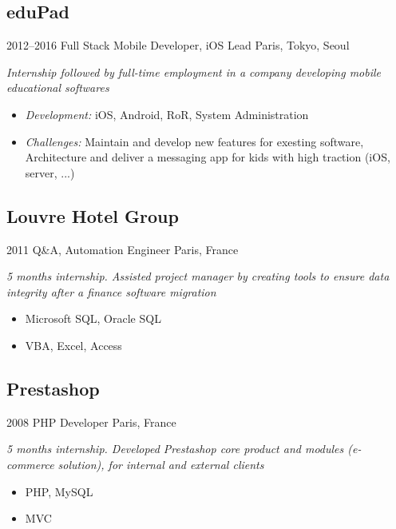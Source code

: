 \documentclass[]{template/friggeri-cv} %
\begin{document}
\subsection{eduPad}
\begin{entrylist}


\entry
{2012--2016}
{Full Stack Mobile Developer, iOS Lead}
{Paris, Tokyo, Seoul}
{\emph{Internship followed by full-time employment in a company developing mobile educational softwares}
\begin{itemize}
\item{\emph{Development:} iOS, Android, RoR, System Administration}
\item{\emph{Challenges:} Maintain and develop new features for exesting software, Architecture and deliver a messaging app for kids with high traction (iOS, server, ...)}

\end{itemize}
}

\end{entrylist}



\subsection{Louvre Hotel Group}
\begin{entrylist}
\entry
{2011}
{Q\&A, Automation Engineer}
{Paris, France}
{\emph{5 months internship. Assisted project manager by creating tools to ensure data integrity after a finance software migration}\\
\begin{itemize}
\item {Microsoft SQL, Oracle SQL}
\item {VBA, Excel, Access}

\end{itemize}

}
\end{entrylist}

\goodbreak
\subsection{Prestashop}
\begin{entrylist}
\entry
{2008}
{PHP Developer}
{Paris, France}
{\emph{5 months internship. Developed Prestashop core product and modules (e-commerce solution), for internal and external clients}

\begin{itemize}

\item {PHP, MySQL}
\item {MVC}

\end{itemize}
}
\end{entrylist}
\end{document}
